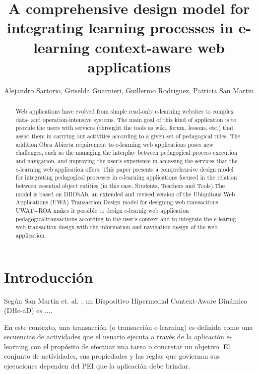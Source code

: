 \documentclass{llncs}
\begin{document}
\title{A comprehensive design model for integrating
learning  processes in e-learning context-aware web applications}

\author{Alejandro Sartorio, Griselda Guarnieri, Guillermo Rodriguez, Patricia San Martin}



\maketitle


\begin{abstract}
Web applications have evolved from simple read-only e-learning websites to
complex data- and operation-intensive systems. The main goal of this kind of
application is to provide the users with services (throught the tools as wiki, forum, lessons, etc.) that assist them in carrying out activities according to a given set of pedagogical rules. The addition Obra Abierta requirement to e-learning web applications poses new challenges, such as the managing the
interplay between pedagogical process execution and navigation, and improving
the user’s experience in accessing the services that the e-learning web application offers.
This paper presents a comprehensive design model for integrating pedagogical
processes in e-learning applications focused in the relation between essential object entities (in this case, Students, Teachers and Tools).The model is based on DRObAb, an extended
and revised version of the Ubiquitous Web Applications (UWA) Transaction
Design model for designing web transactions. UWAT+ROA makes it possible to
design e-learnig web application pedagogicaltransactions according to the user’s context and to
integrate the e-learnig web transaction design with the information and navigation design
of the web application.
\end{abstract}


\section {Introducción}

Según San Martín et. al. \cite{libro}, un  Dispositivo Hipermedial Context-Aware Dinámico (DHc-aD) es ....


En este contexto, una transacción (o transacción e-learning) es definida como una secuencias de actividades que el usuario ejecuta a través de la aplicación e-learning con el propósito de efectuar una tarea o concretar un objetivo. El conjunto de actividades, sus propiedades y las reglas que goviernan sus ejecuciones dependen del PEI que la aplicación debe brindar.
\end{document}
